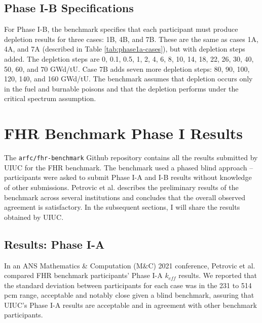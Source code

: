 \subsection{Phase I-B Specifications}
For Phase I-B, the benchmark specifies that each participant must produce 
depletion results for three cases: 1B, 4B, and 7B. 
These are the same as cases 1A, 4A, and 7A (described in Table \ref{tab:phase1a-cases}), 
but with depletion steps added. 
The depletion steps are 0, 0.1, 0.5, 1, 2, 4, 6, 8, 10, 14, 18, 22, 26, 30, 40, 50, 
60, and 70 GWd/tU. 
Case 7B adds seven more depletion steps: 80, 90, 100, 120, 140, and 160 GWd/tU. 
The benchmark assumes that depletion occurs only in the fuel and burnable poisons 
and that the depletion performs under the critical spectrum assumption. 

\section{FHR Benchmark Phase I Results}
\label{sec:fhr-phase1-results}
The \texttt{arfc/fhr-benchmark} Github repository \cite{chee_arfcfhr-benchmark_2021} 
contains all the results submitted by \gls{UIUC} for the \gls{FHR} benchmark. 
The benchmark used a phased blind approach -- participants were asked to 
submit Phase I-A and I-B results without knowledge of other submissions. 
Petrovic et al. \cite{petrovic_preliminary_2021} describes the preliminary 
results of the benchmark across several institutions and concludes 
that the overall observed agreement is satisfactory. 
In the subsequent sections, I will share the results obtained by \gls{UIUC}. 

\subsection{Results: Phase I-A}
\label{sec:fhr-benchmark-results-ia}
In an \gls{ANS} Mathematics \& Computation (M$\&$C) 2021 conference, 
Petrovic et al. \cite{petrovic_preliminary_2021} 
compared \gls{FHR} benchmark participants' Phase I-A $k_{eff}$ results.  
We reported that the standard deviation between participants for each case 
was in the 231 to 514 pcm range, acceptable and notably close given a blind 
benchmark, assuring that \gls{UIUC}'s Phase I-A results are acceptable and 
in agreement with other benchmark participants. 

